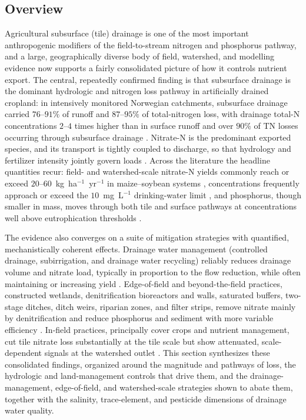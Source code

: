 \subsection{Overview}

Agricultural subsurface (tile) drainage is one of the most important
anthropogenic modifiers of the field-to-stream nitrogen and phosphorus
pathway, and a large, geographically diverse body of field, watershed,
and modelling evidence now supports a fairly consolidated picture of how
it controls nutrient export. The central, repeatedly confirmed finding
is that subsurface drainage is the dominant hydrologic and nitrogen loss
pathway in artificially drained cropland: in intensively monitored
Norwegian catchments, subsurface drainage carried $76$--$91\%$ of runoff
and $87$--$95\%$ of total-nitrogen loss, with drainage total-N
concentrations $2$--$4$ times higher than in surface runoff and over
$90\%$ of TN losses occurring through subsurface drainage
\parencite{Bechmann2014}. Nitrate-N is the predominant exported species,
and its transport is tightly coupled to discharge, so that hydrology and
fertilizer intensity jointly govern loads \parencite{Raymond2012}. Across
the literature the headline quantities recur: field- and watershed-scale
nitrate-N yields commonly reach or exceed $20$--$60$~kg~ha$^{-1}$~yr$^{-1}$
in maize--soybean systems \parencite{Gentry2009,Gentry2014,Dattamudi2020,Tomer2008},
concentrations frequently approach or exceed the $10$~mg~L$^{-1}$
drinking-water limit \parencite{Dattamudi2020,Gordon2021}, and phosphorus,
though smaller in mass, moves through both tile and surface pathways at
concentrations well above eutrophication thresholds \parencite{Smith2008,Tomer2008}.

The evidence also converges on a suite of mitigation strategies with
quantified, mechanistically coherent effects. Drainage water management
(controlled drainage, subirrigation, and drainage water recycling)
reliably reduces drainage volume and nitrate load, typically in
proportion to the flow reduction, while often maintaining or increasing
yield \parencite{Skaggs2010,Youssef2018,Wu2025,Madramootoo2024}.
Edge-of-field and beyond-the-field practices, constructed wetlands,
denitrification bioreactors and walls, saturated buffers, two-stage
ditches, ditch weirs, riparian zones, and filter strips, remove nitrate
mainly by denitrification and reduce phosphorus and sediment with more
variable efficiency \parencite{Tanner2005,Jaynes2008,Hodaj2017,Strock2025b,JACOBS1985}.
In-field practices, principally cover crops and nutrient management, cut
tile nitrate loss substantially at the tile scale but show attenuated,
scale-dependent signals at the watershed outlet
\parencite{Hanrahan2018,Speir2022,Gentry2014}. This section synthesizes
these consolidated findings, organized around the magnitude and pathways
of loss, the hydrologic and land-management controls that drive them, and
the drainage-management, edge-of-field, and watershed-scale strategies
shown to abate them, together with the salinity, trace-element, and
pesticide dimensions of drainage water quality.

